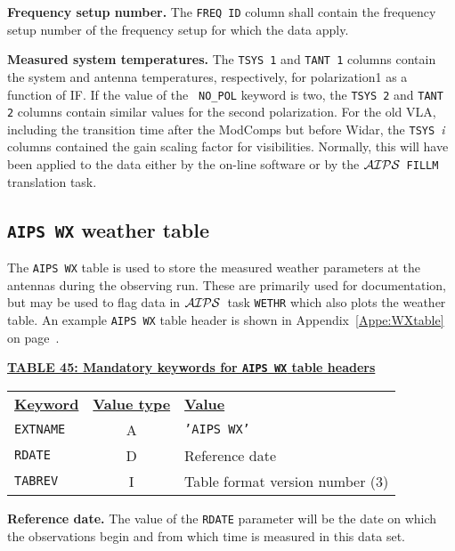 \documentclass[twoside]{article}
\newcommand{\AIPS}{{$\cal AIPS\/$}}
\begin{document}
{\bf Frequency setup number.}  The {\tt FREQ ID} column shall contain
the frequency setup number of the frequency setup for which the data
apply.

{\bf Measured system temperatures.} The {\tt TSYS 1} and {\tt TANT 1}
columns contain the system and antenna temperatures, respectively,
for polarization1 as a function of IF\@.  If the value of the {\tt
  NO\_POL} keyword is two, the {\tt TSYS 2} and {\tt TANT 2} columns
contain similar values for the second polarization.  For the old VLA,
including the transition time after the ModComps but before Widar,
the {\tt TSYS\ }{\it i} columns contained the gain scaling factor for
visibilities.  Normally, this will have been applied to the data
either by the on-line software or by the \AIPS\ {\tt FILLM}
translation task.

\subsection{{\tt AIPS WX} weather table}
\label{s:WX}

The {\tt AIPS WX} table is used to store the measured weather
parameters at the antennas during the observing run.  These are
primarily used for documentation, but may be used to flag data in
\AIPS\ task {\tt WETHR} which also plots the weather table.  An
example {\tt AIPS WX} table header is shown in
Appendix~\ref{Appe:WXtable} on page~\pageref{Appe:WXtable}.

\begin{center}
\underline{\bf{TABLE 45: Mandatory keywords for {\tt AIPS WX} table
    headers}}\\
\begin{tabular}{lcl}
\noalign{\vspace{2pt}} \label{ta:WXkeys}
\underline{{\bf Keyword}} & \underline{\bf{Value type}} &
    \underline{\bf{Value\vphantom{y}}} \\
\noalign{\vspace{2pt}}
{\tt EXTNAME}   & A & {\tt 'AIPS WX'}  \\
{\tt RDATE}     & D & Reference date\\
{\tt TABREV}    & I & Table format version number (3)
\end{tabular}
\end{center}

{\bf Reference date.} The value of the {\tt RDATE} parameter will be
the date on which the observations begin and from which time is
measured in this data set.
\end{document}
